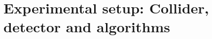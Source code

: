 \documentclass[
twoside=true,
headsepline,     %
headings=normal,
open=right,
numbers=noenddot, %
a4paper,
11pt
]{scrreprt} %
\begin{document}
\part{Experimental setup: Collider, detector and algorithms } \label{part:Experiment}


%  
%  
%  
%  
%  
%  
%  
%  
%  
%  

%  

% 

% 
% 

\cleardoublepage 




% 
\end{document}
